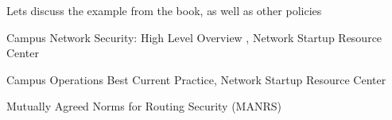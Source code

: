 \documentclass[Screen16to9,17pt]{foils}
\begin{document}


Lets discuss the example from the book, as well as other policies

Campus Network Security: High Level Overview , Network Startup Resource Center

Campus Operations Best Current Practice, Network Startup Resource Center

Mutually Agreed Norms for Routing Security (MANRS)





\slidenext
\end{document}
